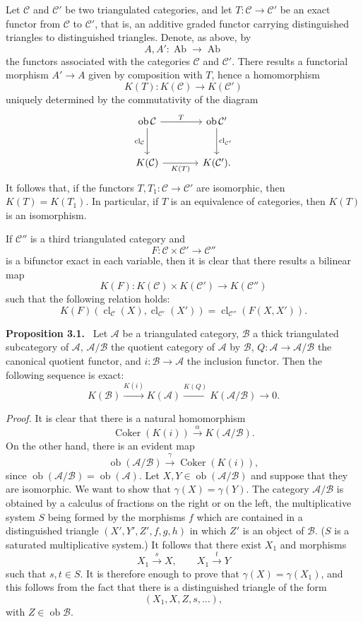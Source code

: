 \documentclass[11pt]{article}
\newenvironment{statement}[1]{\par\medskip\noindent\textbf{#1.}\ }{\par\medskip}
\providecommand{\Ob}{\operatorname{ob}}
\providecommand{\cC}{\mathcal C}
\providecommand{\Ob}{\operatorname{ob}}
\providecommand{\Ab}{\operatorname{Ab}}
\providecommand{\cC}{\mathcal C}
\providecommand{\cA}{\mathcal A}
\providecommand{\cB}{\mathcal B}
\providecommand{\Ab}{\operatorname{Ab}}
\providecommand{\Ob}{\operatorname{Ob}}
\providecommand{\Ob}{\operatorname{ob}}
\providecommand{\Ob}{\operatorname{Ob}}
\begin{document}
Let $\cC$ and $\cC'$ be two triangulated categories, and let $T:\cC\to\cC'$ be an exact functor from $\cC$ to $\cC'$, that is, an additive graded functor carrying distinguished triangles to distinguished triangles. Denote, as above, by
\[
A,A':\Ab\longrightarrow\Ab
\]
the functors associated with the categories $\cC$ and $\cC'$. There results a functorial morphism $A'\to A$ given by composition with $T$, hence a homomorphism
\[
K(T):K(\cC)\longrightarrow K(\cC')
\]
uniquely determined by the commutativity of the diagram
\[
\begin{tikzcd}[column sep=large,row sep=large]
\Ob\cC \arrow[r,"T"] \arrow[d,"\operatorname{cl}_{\cC}"']&
\Ob\cC' \arrow[d,"\operatorname{cl}_{\cC'}"]\\
K(\cC) \arrow[r,"K(T)"']& K(\cC').
\end{tikzcd}
\]
It follows that, if the functors $T,T_1:\cC\to\cC'$ are isomorphic, then $K(T)=K(T_1)$. In particular, if $T$ is an equivalence of categories, then $K(T)$ is an isomorphism.

If $\cC''$ is a third triangulated category and
\[
F:\cC\times\cC'\longrightarrow \cC''
\]
is a bifunctor exact in each variable, then it is clear that there results a bilinear map
\[
K(F):K(\cC)\times K(\cC')\longrightarrow K(\cC'')
\]
such that the following relation holds:
\[
K(F)(\operatorname{cl}_{\cC}(X),\operatorname{cl}_{\cC'}(X'))
=
\operatorname{cl}_{\cC''}(F(X,X')).
\]

\begin{statement}{Proposition 3.1}
Let $\cA$ be a triangulated category, $\cB$ a thick triangulated subcategory of $\cA$, $\cA/\cB$ the quotient category of $\cA$ by $\cB$, $Q:\cA\to\cA/\cB$ the canonical quotient functor, and $i:\cB\to\cA$ the inclusion functor. Then the following sequence is exact:
\[
K(\cB)\xrightarrow{K(i)}K(\cA)\xrightarrow{K(Q)}K(\cA/\cB)\longrightarrow 0.
\]
\end{statement}

\emph{Proof.} It is clear that there is a natural homomorphism
\[
\operatorname{Coker}(K(i))\xrightarrow{\alpha}K(\cA/\cB).
\]
On the other hand, there is an evident map
\[
\Ob(\cA/\cB)\xrightarrow{\gamma}\operatorname{Coker}(K(i)),
\]
since $\Ob(\cA/\cB)=\Ob(\cA)$. Let $X,Y\in\Ob(\cA/\cB)$ and suppose that they are isomorphic. We want to show that $\gamma(X)=\gamma(Y)$. The category $\cA/\cB$ is obtained by a calculus of fractions on the right or on the left, the multiplicative system $S$ being formed by the morphisms $f$ which are contained in a distinguished triangle $(X',Y',Z',f,g,h)$ in which $Z'$ is an object of $\cB$. ($S$ is a saturated multiplicative system.) It follows that there exist $X_1$ and morphisms
\[
X_1\xrightarrow{s}X,\qquad X_1\xrightarrow{t}Y
\]
such that $s,t\in S$. It is therefore enough to prove that $\gamma(X)=\gamma(X_1)$, and this follows from the fact that there is a distinguished triangle of the form
\[
(X_1,X,Z,s,\ldots),
\]
with $Z\in\Ob\cB$.
\end{document}
